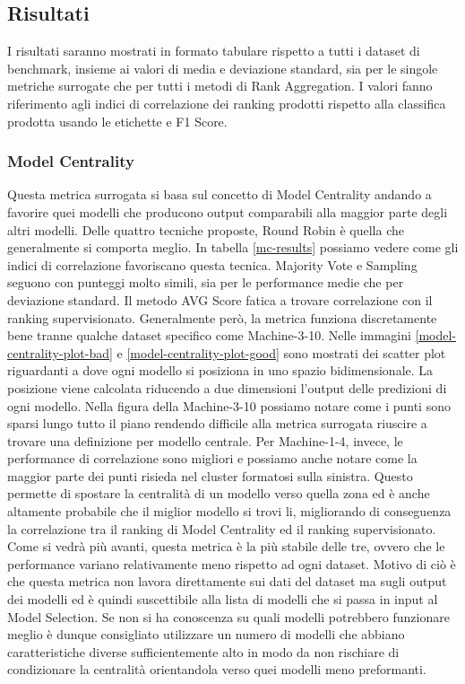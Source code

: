\subsection{Risultati}
I risultati saranno mostrati in formato tabulare rispetto a tutti i dataset di benchmark, insieme ai valori di media e deviazione standard, sia per le singole metriche surrogate che per tutti i metodi di Rank Aggregation.
I valori fanno riferimento agli indici di correlazione dei ranking prodotti rispetto alla classifica prodotta usando le etichette e F1 Score.


\subsubsection{Model Centrality}
Questa metrica surrogata si basa sul concetto di Model Centrality andando a favorire quei modelli che producono output comparabili alla maggior parte degli altri modelli. Delle quattro tecniche proposte, Round Robin è quella che generalmente si comporta meglio. In tabella \ref{mc-results} possiamo vedere come gli indici di correlazione favoriscano questa tecnica.
Majority Vote e Sampling seguono con punteggi molto simili, sia per le performance medie che per deviazione standard. Il metodo AVG Score fatica a trovare correlazione con il ranking supervisionato. 
Generalmente però, la metrica funziona discretamente bene tranne qualche dataset specifico come Machine-3-10.  Nelle immagini \ref{model-centrality-plot-bad} e \ref{model-centrality-plot-good} sono mostrati dei scatter plot riguardanti a dove ogni modello si posiziona in uno spazio bidimensionale. La posizione viene calcolata riducendo a due dimensioni l'output delle predizioni di ogni modello.  Nella figura della Machine-3-10 possiamo notare come i punti sono sparsi lungo tutto il piano rendendo difficile alla metrica surrogata riuscire a trovare una definizione per modello centrale.
Per Machine-1-4, invece, le performance di correlazione sono migliori e possiamo anche notare come la maggior parte dei punti risieda nel cluster formatosi sulla sinistra. Questo permette di spostare la centralità di un modello verso quella zona ed è anche altamente probabile che il miglior modello si trovi li, migliorando di conseguenza la correlazione tra il ranking di Model Centrality ed il ranking supervisionato.
Come si vedrà più avanti, questa metrica è la più stabile delle tre, ovvero che le performance variano relativamente meno rispetto ad ogni dataset. Motivo di ciò è che questa metrica non lavora direttamente sui dati del dataset ma sugli output dei modelli ed è quindi suscettibile alla lista di modelli che si passa in input al Model Selection. Se non si ha conoscenza su quali modelli potrebbero funzionare meglio è dunque consigliato utilizzare un numero di modelli che abbiano caratteristiche diverse sufficientemente alto in modo da non rischiare di condizionare la centralità orientandola verso quei modelli meno preformanti.


